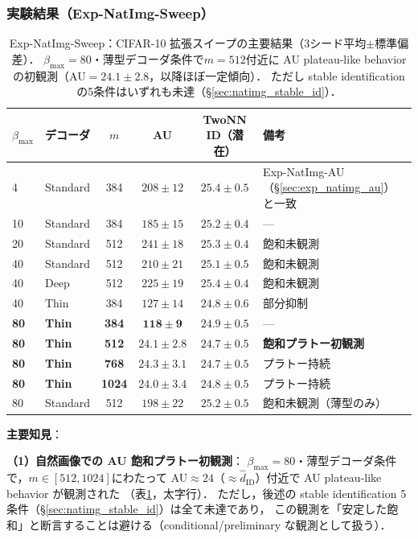 \documentclass[11pt,a4paper]{jsarticle}
\begin{document}
\subsubsection*{実験結果（Exp-NatImg-Sweep）}

\begin{table}[H]
\centering
\caption{Exp-NatImg-Sweep：CIFAR-10 拡張スイープの主要結果（3シード平均$\pm$標準偏差）．
$\beta_{\max}=80$・薄型デコーダ条件で$m=512$付近に AU plateau-like behavior の初観測（AU$=24.1\pm2.8$，以降ほぼ一定傾向）．
ただし stable identification の5条件はいずれも未達（§\ref{sec:natimg_stable_id}）．}
\label{tab:natimg_sweep}
\small
\begin{tabular}{llcccl}
\toprule
$\beta_{\max}$ & デコーダ & $m$ & AU & TwoNN ID（潜在） & 備考 \\
\midrule
4  & Standard & 384 & $208\pm12$ & $25.4\pm0.5$ & Exp-NatImg-AU（§\ref{sec:exp_natimg_au}）と一致 \\
10 & Standard & 384 & $185\pm15$ & $25.2\pm0.4$ & --- \\
20 & Standard & 512 & $241\pm18$ & $25.3\pm0.4$ & 飽和未観測 \\
40 & Standard & 512 & $210\pm21$ & $25.1\pm0.5$ & 飽和未観測 \\
40 & Deep      & 512 & $225\pm19$ & $25.4\pm0.4$ & 飽和未観測 \\
40 & Thin      & 384 & $127\pm14$ & $24.8\pm0.6$ & 部分抑制 \\
\textbf{80} & \textbf{Thin} & \textbf{384} & $\boldsymbol{118\pm9}$ & $24.9\pm0.5$ & --- \\
\textbf{80} & \textbf{Thin} & \textbf{512} & $\boldsymbol{24.1\pm2.8}$ & $24.7\pm0.5$ & \textbf{飽和プラトー初観測} \\
\textbf{80} & \textbf{Thin} & \textbf{768} & $\boldsymbol{24.3\pm3.1}$ & $24.7\pm0.5$ & プラトー持続 \\
\textbf{80} & \textbf{Thin} & \textbf{1024}& $\boldsymbol{24.0\pm3.4}$ & $24.8\pm0.5$ & プラトー持続 \\
80 & Standard  & 512 & $198\pm22$ & $25.2\pm0.5$ & 飽和未観測（薄型のみ） \\
\bottomrule
\end{tabular}
\end{table}

\textbf{主要知見}：

\textbf{（1）自然画像での AU 飽和プラトー初観測}：
$\beta_{\max}=80$・薄型デコーダ条件で，$m \in [512, 1024]$にわたって
AU$\approx 24$（$\approx \hat{d}_\mathrm{ID}$）付近で AU plateau-like behavior が観測された
（表\ref{tab:natimg_sweep}，太字行）．
ただし，後述の stable identification 5条件（§\ref{sec:natimg_stable_id}）は全て未達であり，
この観測を「安定した飽和」と断言することは避ける（conditional/preliminary な観測として扱う）．
\end{document}

